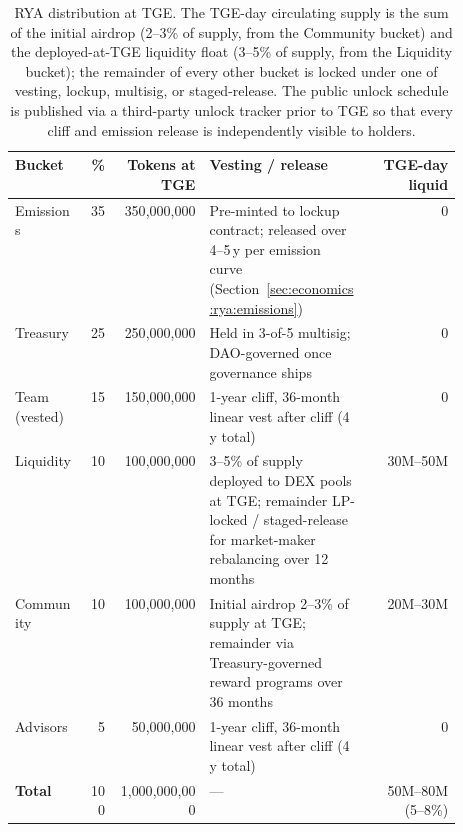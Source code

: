 \documentclass[11pt,a4paper]{article}
\begin{document}
\begin{table}[h]
\centering
\small
\begin{tabular}{p{0.16\linewidth}rrp{0.36\linewidth}r}
\toprule
\textbf{Bucket} & \textbf{\%} & \textbf{Tokens at TGE} & \textbf{Vesting / release} &
\textbf{TGE-day liquid} \\
\midrule
Emissions      & 35  & 350{,}000{,}000   & Pre-minted to lockup contract; released
                                          over 4--5\,y per emission curve
                                          (Section~\ref{sec:economics:rya:emissions})
                                          & 0 \\
Treasury       & 25  & 250{,}000{,}000   & Held in 3-of-5 multisig; DAO-governed once
                                          governance ships & 0 \\
Team (vested)  & 15  & 150{,}000{,}000   & 1-year cliff, 36-month linear vest after
                                          cliff (4\,y total) & 0 \\
Liquidity      & 10  & 100{,}000{,}000   & 3--5\% of supply deployed to DEX pools at
                                          TGE; remainder LP-locked / staged-release
                                          for market-maker rebalancing over 12 months
                                          & 30M--50M \\
Community      & 10  & 100{,}000{,}000   & Initial airdrop 2--3\% of supply at TGE;
                                          remainder via Treasury-governed reward
                                          programs over 36 months & 20M--30M \\
Advisors       &  5  &  50{,}000{,}000   & 1-year cliff, 36-month linear vest after
                                          cliff (4\,y total) & 0 \\
\midrule
\textbf{Total} & 100 & 1{,}000{,}000{,}000 & --- & 50M--80M (5--8\%) \\
\bottomrule
\end{tabular}
\caption{RYA distribution at TGE. The TGE-day circulating supply is the sum of the
initial airdrop (2--3\% of supply, from the Community bucket) and the
deployed-at-TGE liquidity float (3--5\% of supply, from the Liquidity bucket); the
remainder of every other bucket is locked under one of vesting, lockup, multisig, or
staged-release. The public unlock schedule is published via a third-party unlock
tracker prior to TGE so that every cliff and emission release is independently
visible to holders.}
\label{tab:rya-dist}
\end{table}
\end{document}
